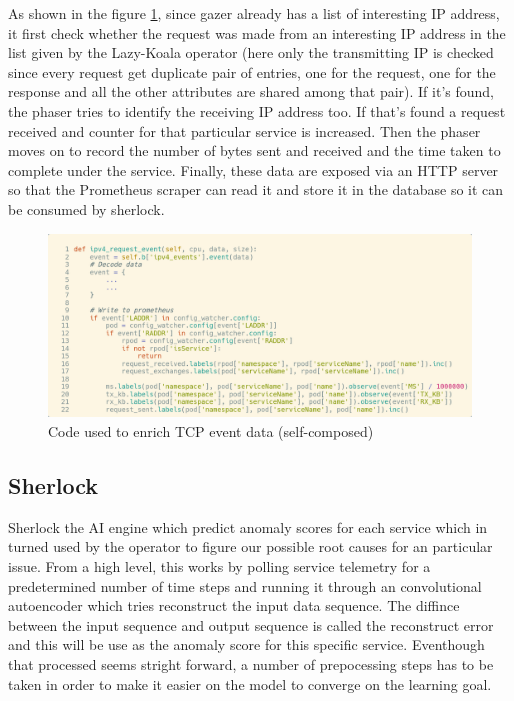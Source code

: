 As shown in the figure \ref{fig:gazer-enrich}, since gazer already has a list of interesting IP address, it first check whether the request was made from an interesting IP address in the list given by the Lazy-Koala operator (here only the transmitting IP is checked since every request get duplicate pair of entries, one for the request, one for the response and all the other attributes are shared among that pair). If it's found, the phaser tries to identify the receiving IP address too. If that's found a request received and counter for that particular service is increased. Then the phaser moves on to record the number of bytes sent and received and the time taken to complete under the service. Finally, these data are exposed via an HTTP server so that the Prometheus scraper can read it and store it in the database so it can be consumed by sherlock.

\begin{figure}[H]
    \includegraphics[width=14cm]{assets/implementation/gazer-enrich.png}
    \caption{Code used to enrich TCP event data (self-composed)}
    \label{fig:gazer-enrich}
\end{figure}


\subsection{Sherlock}

Sherlock the AI engine which predict anomaly scores for each service which in turned used by the operator to figure our possible root causes for an particular issue. From a high level, this works by polling service telemetry for a predetermined number of time steps and running it through an convolutional autoencoder which tries reconstruct the input data sequence. The diffince between the input sequence and output sequence is called the reconstruct error and this will be use as the anomaly score for this specific service. Eventhough that processed seems stright forward, a number of prepocessing steps has to be taken in order to make it easier on the model to converge on the learning goal.

